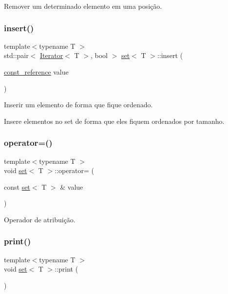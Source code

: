 Remover um determinado elemento em uma posição. 

\mbox{\label{classset_a1e5e9e97d5223668325edfb1e6c22546}} 
\subsubsection{\texorpdfstring{insert()}{insert()}}
{\footnotesize\ttfamily template$<$typename T $>$ \\
std\+::pair$<$ \hyperlink{classIterator}{Iterator}$<$ T $>$, bool $>$ \hyperlink{classset}{set}$<$ T $>$\+::insert (\begin{DoxyParamCaption}\item[{\hyperlink{classset_aaafc18d8ba5261e496a013e32b9dbe28}{const\+\_\+reference}}]{value }\end{DoxyParamCaption})}



Inserir um elemento de forma que fique ordenado. 

Insere elementos no set de forma que eles fiquem ordenados por tamanho. \mbox{\label{classset_a1a80773dd573dd616df89696adb5e60e}} 
\subsubsection{\texorpdfstring{operator=()}{operator=()}}
{\footnotesize\ttfamily template$<$typename T $>$ \\
void \hyperlink{classset}{set}$<$ T $>$\+::operator= (\begin{DoxyParamCaption}\item[{const \hyperlink{classset}{set}$<$ T $>$ \&}]{value }\end{DoxyParamCaption})}



Operador de atribuição. 

\mbox{\label{classset_a25a1b1defd5c15a1afe0661b6ac53949}} 
\subsubsection{\texorpdfstring{print()}{print()}}
{\footnotesize\ttfamily template$<$typename T $>$ \\
void \hyperlink{classset}{set}$<$ T $>$\+::print (\begin{DoxyParamCaption}{ }\end{DoxyParamCaption})}



